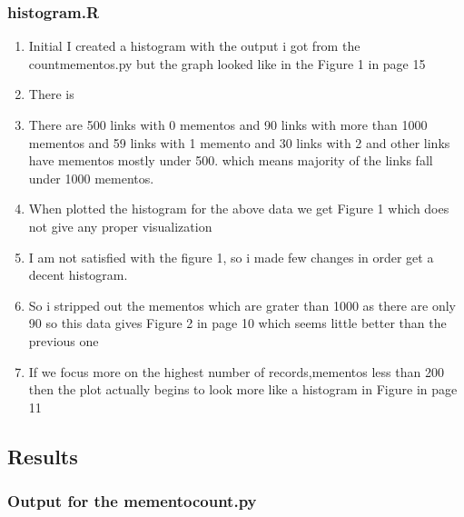 \subsubsection{histogram.R}

\begin{enumerate}
\item Initial I created a histogram with the output i got from the countmementos.py but the graph looked like in the Figure 1 in page 15
\item There is  
\item There are 500 links with 0 mementos and 90 links with more than 1000 mementos and 59 links with 1 memento and 30 links with 2 and other links have mementos mostly under 500. which means majority of the links fall under 1000 mementos. 
\item When plotted the histogram for the above data we get Figure 1 which does not give any proper visualization 
\item I am not satisfied with the figure 1, so i made few changes in order get a decent histogram.
\item So i stripped out the mementos which are grater than 1000 as there are only 90 so this data gives Figure 2 in page 10 which seems little better than the previous one
\item  If we focus more on the highest number of records,mementos less than 200 then the plot actually begins to look more like a histogram in Figure in page 11 
\end{enumerate}

\newpage
\subsection{Results}
\subsubsection{Output for the mementocount.py}

\newpage
